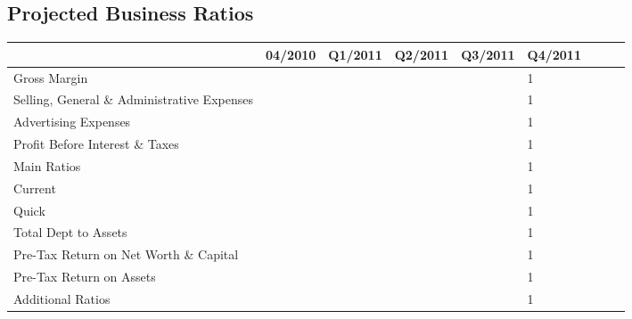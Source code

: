 \documentclass[11pt,titlepage]{article}
\begin{document}
\newpage
\thispagestyle{empty}
\begin{landscape}
\subsection{Projected Business Ratios}
\begin{scriptsize}
\begin{tabular}{ | l | l | l | l | l | l | l | l | l |}\hline
  & 04/2010 & Q1/2011 & Q2/2011 & Q3/2011 & Q4/2011 \\ \hline
  Gross Margin & & & & & 1\\ \hline
  Selling, General \& Administrative Expenses & & & & & 1 \\ \hline
  Advertising Expenses & & & & & 1\\ \hline
  Profit Before Interest \& Taxes & & & & & 1 \\ \hline
  Main Ratios & & & & & 1\\ \hline
  Current & & & & & 1 \\ \hline
  Quick & & & & & 1\\ \hline
  Total Dept to Assets & & & & & 1 \\ \hline
  Pre-Tax Return on Net Worth \& Capital & & & & & 1\\ \hline
  Pre-Tax Return on Assets & & & & & 1 \\ \hline
  Additional Ratios & & & & & 1 \\ \hline

\end{tabular}
\end{scriptsize}
\end{landscape}
\end{document}
